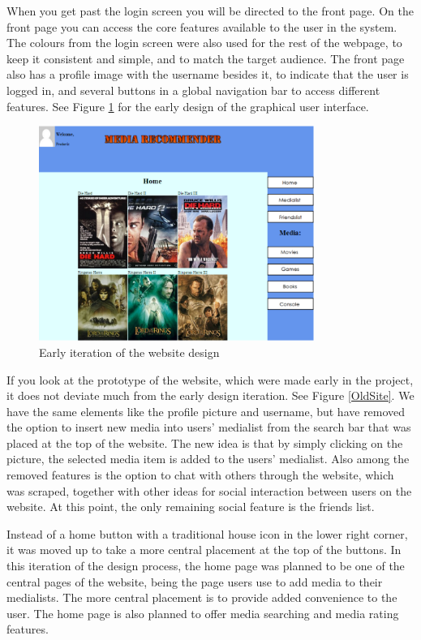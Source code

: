 When you get past the login screen you will be directed to the front page. On the front page you can access the core features available to the user in the system. The colours from the login screen were also used for the rest of the webpage, to keep it consistent and simple, and to match the target audience. The front page also has a profile image with the username besides it, to indicate that the user is logged in, and several buttons in a global navigation bar to access different features. See Figure \ref{CurrSite} for the early design of the graphical user interface.

\begin{figure}[htb]
\centering
\includegraphics[width=0.8\textwidth]{Images/CurrSite.png}
\caption{Early iteration of the website design}
\label{CurrSite}
\end{figure}


If you look at the prototype of the website, which were made early in the project, it does not deviate much from the early design iteration. See Figure \ref{OldSite}. We have the same elements like the profile picture and username, but have removed the option to insert new media into users' medialist from the search bar that was placed at the top of the website. The new idea is that by simply clicking on the picture, the selected media item is added to the users’ medialist. Also among the removed features is the option to chat with others through the website, which was scraped, together with other ideas for social interaction between users on the website. At this point, the only remaining social feature is the friends list. 

Instead of a home button with a traditional house icon in the lower right corner, it was moved up to take a more central placement at the top of the buttons. In this iteration of the design process, the home page was planned to be one of the central pages of the website, being the page users use to add media to their medialists. The more central placement is to provide added convenience to the user. The home page is also planned to offer media searching and media rating features.

